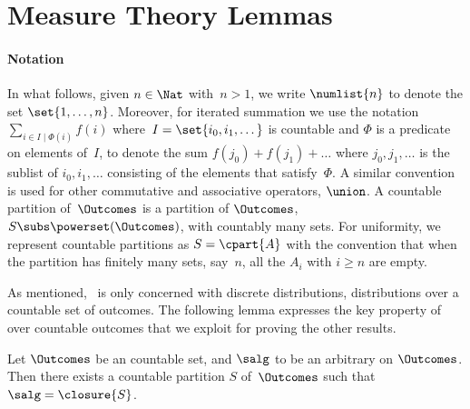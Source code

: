 \section{Measure Theory Lemmas}

\paragraph{Notation}
In what follows,
given $n\in\Nat$ with~$n> 1$,
we write $\numlist{n}$
to denote the set $\set{1, \dots, n}$.
Moreover, for iterated summation we use the
notation
$
  \sum_{i \in I \mid \Phi(i)} f(i)
$
where~$I = \set{i_0, i_1, \dots}$ is countable
and $\Phi$ is a predicate on elements of~$I$,
to denote the sum $ f(j_0) + f(j_1) + \dots $
where $j_0, j_1, \dots$ is the sublist of $ i_0, i_1, \dots $ consisting
of the elements that satisfy~$\Phi$.
A similar convention is used for other commutative and associative operators,
\eg $\union$.
A countable partition of~$\Outcomes$ is a partition of $\Outcomes$,
$S \subs \powerset(\Outcomes)$,
with countably many sets.
For uniformity, we represent countable partitions as $S = \cpart{A}$
with the convention that when the partition has finitely many sets,
say~$n$, all the $A_i$ with $i \geq n$ are empty.

As mentioned, \thelogic\ is only concerned with discrete distributions,
\ie distributions over a countable set of outcomes.
The following lemma expresses the key property of \salgebra[s]
over countable outcomes that we exploit for proving the
other results.

\begin{lemma}
  \label{thm:countable-partition-generated}
 Let $\Outcomes$ be an countable set, and $\salg$ to be an arbitrary \salgebra{}
  on $\Outcomes$. Then there exists a countable partition $S$ of~$\Outcomes$
  such that $\salg = \closure{S}$.
\end{lemma}

